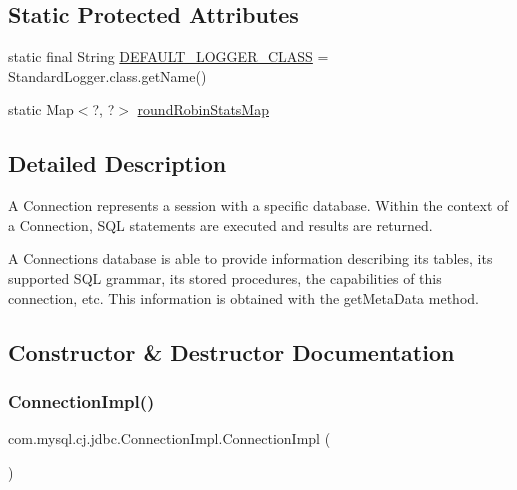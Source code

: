\subsection*{Static Protected Attributes}
\begin{DoxyCompactItemize}
\item 
static final String \mbox{\hyperlink{classcom_1_1mysql_1_1cj_1_1jdbc_1_1_connection_impl_a6ed05323d2d46ab866058d5e8271834f}{D\+E\+F\+A\+U\+L\+T\+\_\+\+L\+O\+G\+G\+E\+R\+\_\+\+C\+L\+A\+SS}} = Standard\+Logger.\+class.\+get\+Name()
\item 
static Map$<$?, ?$>$ \mbox{\hyperlink{classcom_1_1mysql_1_1cj_1_1jdbc_1_1_connection_impl_a44606029fe24ee00001a78959f1e8fca}{round\+Robin\+Stats\+Map}}
\end{DoxyCompactItemize}


\subsection{Detailed Description}
A Connection represents a session with a specific database. Within the context of a Connection, S\+QL statements are executed and results are returned.

A Connection\textquotesingle{}s database is able to provide information describing its tables, its supported S\+QL grammar, its stored procedures, the capabilities of this connection, etc. This information is obtained with the get\+Meta\+Data method. 

\subsection{Constructor \& Destructor Documentation}
\mbox{\label{classcom_1_1mysql_1_1cj_1_1jdbc_1_1_connection_impl_ac7a247f4c4dbd5b4867c8bed3b8e882b}} 
\subsubsection{\texorpdfstring{Connection\+Impl()}{ConnectionImpl()}\hspace{0.1cm}{\footnotesize\ttfamily [1/2]}}
{\footnotesize\ttfamily com.\+mysql.\+cj.\+jdbc.\+Connection\+Impl.\+Connection\+Impl (\begin{DoxyParamCaption}{ }\end{DoxyParamCaption})\hspace{0.3cm}{\ttfamily [protected]}}

